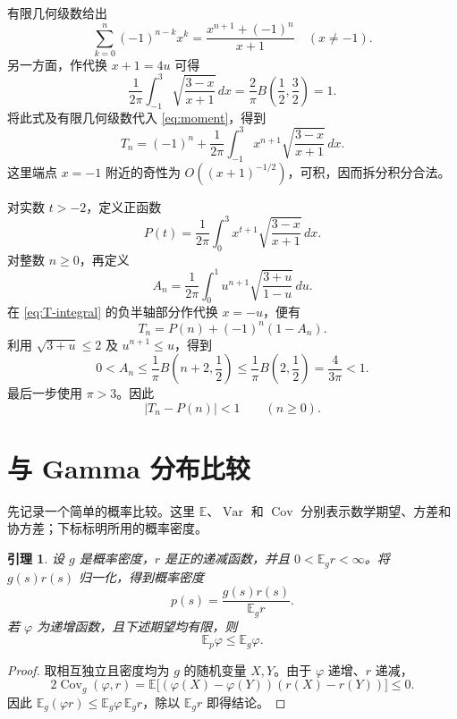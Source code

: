 \documentclass[UTF8,fontset=fandol,11pt]{ctexart}
\newtheorem{lemma}{引理}
\newcommand{\E}{\mathbb{E}}
\DeclareMathOperator{\Var}{Var}
\DeclareMathOperator{\Cov}{Cov}
\begin{document}
有限几何级数给出
\[
\sum_{k=0}^{n}(-1)^{n-k}x^k
=\frac{x^{n+1}+(-1)^n}{x+1}
\quad(x\ne-1).
\]
另一方面，作代换 $x+1=4u$ 可得
\[
\frac1{2\pi}\int_{-1}^{3}
\sqrt{\frac{3-x}{x+1}}\,dx
=\frac2\pi B\left(\frac12,\frac32\right)=1.
\]
将此式及有限几何级数代入 \eqref{eq:moment}，得到
\begin{equation}\label{eq:T-integral}
T_n=(-1)^n+\frac1{2\pi}\int_{-1}^{3}
x^{n+1}\sqrt{\frac{3-x}{x+1}}\,dx.
\end{equation}
这里端点 $x=-1$ 附近的奇性为 $O((x+1)^{-1/2})$，可积，因而拆分积分合法。

对实数 $t>-2$，定义正函数
\begin{equation}\label{eq:P}
P(t)=\frac1{2\pi}\int_0^3
x^{t+1}\sqrt{\frac{3-x}{x+1}}\,dx.
\end{equation}
对整数 $n\ge0$，再定义
\[
A_n=\frac1{2\pi}\int_0^1
u^{n+1}\sqrt{\frac{3+u}{1-u}}\,du.
\]
在 \eqref{eq:T-integral} 的负半轴部分作代换 $x=-u$，便有
\begin{equation}\label{eq:decomposition}
T_n=P(n)+(-1)^n(1-A_n).
\end{equation}
利用 $\sqrt{3+u}\le2$ 及 $u^{n+1}\le u$，得到
\[
0<A_n
\le\frac1\pi B\left(n+2,\frac12\right)
\le\frac1\pi B\left(2,\frac12\right)
=\frac4{3\pi}<1.
\]
最后一步使用 $\pi>3$。因此
\begin{equation}\label{eq:error-one}
|T_n-P(n)|<1
\qquad(n\ge0).
\end{equation}

\section{与 Gamma 分布比较}

先记录一个简单的概率比较。这里 $\E$、$\Var$ 和 $\Cov$ 分别表示数学期望、方差和协方差；下标标明所用的概率密度。

\begin{lemma}\label{lem:comparison}
设 $g$ 是概率密度，$r$ 是正的递减函数，并且 $0<\E_g r<\infty$。将 $g(s)r(s)$ 归一化，得到概率密度
\[
p(s)=\frac{g(s)r(s)}{\E_g r}.
\]
若 $\varphi$ 为递增函数，且下述期望均有限，则
\[
\E_p\varphi\le\E_g\varphi.
\]
\end{lemma}

\begin{proof}
取相互独立且密度均为 $g$ 的随机变量 $X,Y$。由于 $\varphi$ 递增、$r$ 递减，
\[
2\Cov_g(\varphi,r)
=\E\bigl[(\varphi(X)-\varphi(Y))(r(X)-r(Y))\bigr]\le0.
\]
因此 $\E_g(\varphi r)\le\E_g\varphi\,\E_g r$，除以 $\E_g r$ 即得结论。
\end{proof}
\end{document}
